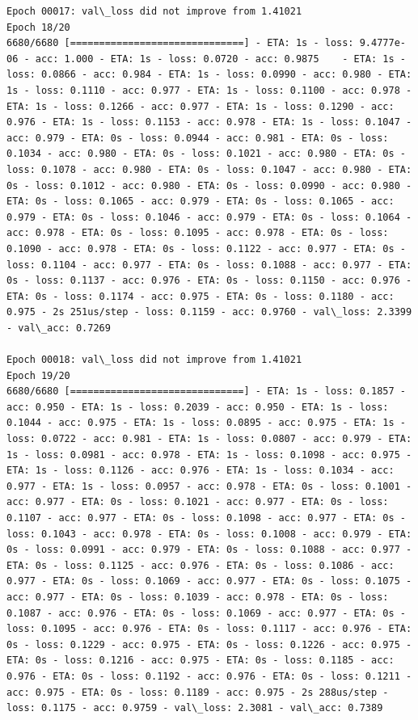 \documentclass[11pt]{article}
\begin{document}
\begin{Verbatim}[commandchars=\\\{\}]
Epoch 00017: val\_loss did not improve from 1.41021
Epoch 18/20
6680/6680 [==============================] - ETA: 1s - loss: 9.4777e-06 - acc: 1.000 - ETA: 1s - loss: 0.0720 - acc: 0.9875    - ETA: 1s - loss: 0.0866 - acc: 0.984 - ETA: 1s - loss: 0.0990 - acc: 0.980 - ETA: 1s - loss: 0.1110 - acc: 0.977 - ETA: 1s - loss: 0.1100 - acc: 0.978 - ETA: 1s - loss: 0.1266 - acc: 0.977 - ETA: 1s - loss: 0.1290 - acc: 0.976 - ETA: 1s - loss: 0.1153 - acc: 0.978 - ETA: 1s - loss: 0.1047 - acc: 0.979 - ETA: 0s - loss: 0.0944 - acc: 0.981 - ETA: 0s - loss: 0.1034 - acc: 0.980 - ETA: 0s - loss: 0.1021 - acc: 0.980 - ETA: 0s - loss: 0.1078 - acc: 0.980 - ETA: 0s - loss: 0.1047 - acc: 0.980 - ETA: 0s - loss: 0.1012 - acc: 0.980 - ETA: 0s - loss: 0.0990 - acc: 0.980 - ETA: 0s - loss: 0.1065 - acc: 0.979 - ETA: 0s - loss: 0.1065 - acc: 0.979 - ETA: 0s - loss: 0.1046 - acc: 0.979 - ETA: 0s - loss: 0.1064 - acc: 0.978 - ETA: 0s - loss: 0.1095 - acc: 0.978 - ETA: 0s - loss: 0.1090 - acc: 0.978 - ETA: 0s - loss: 0.1122 - acc: 0.977 - ETA: 0s - loss: 0.1104 - acc: 0.977 - ETA: 0s - loss: 0.1088 - acc: 0.977 - ETA: 0s - loss: 0.1137 - acc: 0.976 - ETA: 0s - loss: 0.1150 - acc: 0.976 - ETA: 0s - loss: 0.1174 - acc: 0.975 - ETA: 0s - loss: 0.1180 - acc: 0.975 - 2s 251us/step - loss: 0.1159 - acc: 0.9760 - val\_loss: 2.3399 - val\_acc: 0.7269

Epoch 00018: val\_loss did not improve from 1.41021
Epoch 19/20
6680/6680 [==============================] - ETA: 1s - loss: 0.1857 - acc: 0.950 - ETA: 1s - loss: 0.2039 - acc: 0.950 - ETA: 1s - loss: 0.1044 - acc: 0.975 - ETA: 1s - loss: 0.0895 - acc: 0.975 - ETA: 1s - loss: 0.0722 - acc: 0.981 - ETA: 1s - loss: 0.0807 - acc: 0.979 - ETA: 1s - loss: 0.0981 - acc: 0.978 - ETA: 1s - loss: 0.1098 - acc: 0.975 - ETA: 1s - loss: 0.1126 - acc: 0.976 - ETA: 1s - loss: 0.1034 - acc: 0.977 - ETA: 1s - loss: 0.0957 - acc: 0.978 - ETA: 0s - loss: 0.1001 - acc: 0.977 - ETA: 0s - loss: 0.1021 - acc: 0.977 - ETA: 0s - loss: 0.1107 - acc: 0.977 - ETA: 0s - loss: 0.1098 - acc: 0.977 - ETA: 0s - loss: 0.1043 - acc: 0.978 - ETA: 0s - loss: 0.1008 - acc: 0.979 - ETA: 0s - loss: 0.0991 - acc: 0.979 - ETA: 0s - loss: 0.1088 - acc: 0.977 - ETA: 0s - loss: 0.1125 - acc: 0.976 - ETA: 0s - loss: 0.1086 - acc: 0.977 - ETA: 0s - loss: 0.1069 - acc: 0.977 - ETA: 0s - loss: 0.1075 - acc: 0.977 - ETA: 0s - loss: 0.1039 - acc: 0.978 - ETA: 0s - loss: 0.1087 - acc: 0.976 - ETA: 0s - loss: 0.1069 - acc: 0.977 - ETA: 0s - loss: 0.1095 - acc: 0.976 - ETA: 0s - loss: 0.1117 - acc: 0.976 - ETA: 0s - loss: 0.1229 - acc: 0.975 - ETA: 0s - loss: 0.1226 - acc: 0.975 - ETA: 0s - loss: 0.1216 - acc: 0.975 - ETA: 0s - loss: 0.1185 - acc: 0.976 - ETA: 0s - loss: 0.1192 - acc: 0.976 - ETA: 0s - loss: 0.1211 - acc: 0.975 - ETA: 0s - loss: 0.1189 - acc: 0.975 - 2s 288us/step - loss: 0.1175 - acc: 0.9759 - val\_loss: 2.3081 - val\_acc: 0.7389


\end{Verbatim}
\end{document}
